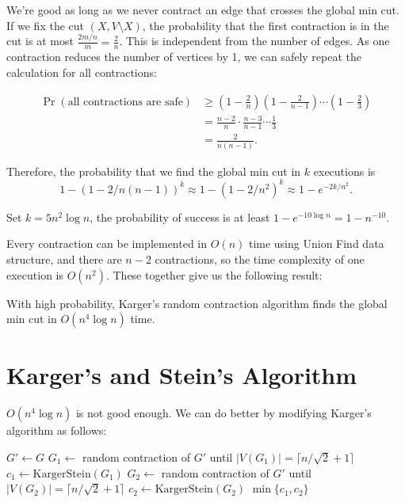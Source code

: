 We're good as long as we never contract an edge that crosses the global min cut. If we fix the cut $(X, V\setminus X)$, the probability that the first contraction is in the cut is at most $\frac{2m/n}{m} = \frac{2}{n}$. This is independent from the number of edges. As one contraction reduces the number of vertices by 1, we can safely repeat the calculation for all contractions:

\begin{align*}
	\Pr(\text{all contractions are safe}) & \geq \left(1-\frac{2}{n}\right)\left(1-\frac{2}{n-1}\right)\cdots \left(1-\frac{2}{3}\right) \\
	                                      & = \frac{n-2}{n}\cdot \frac{n-3}{n-1}\cdots \frac{1}{3}                                       \\
	                                      & = \frac{2}{n(n-1)}.
\end{align*}

Therefore, the probability that we find the global min cut in $k$ executions is
\[
	1 - (1 - 2/n(n-1))^k \approx 1 - (1-2/n^2)^k \approx 1 - e^{-2k/n^2}.
\]

Set $k = 5n^2\log n$, the probability of success is at least $1 - e^{-10\log n} = 1 - n^{-10}$.

Every contraction can be implemented in $O(n)$ time using Union Find data structure, and there are $n-2$ contractions, so the time complexity of one execution is $O(n^2)$. These together give us the following result:

\begin{theorem}
	With high probability, Karger's random contraction algorithm finds the global min cut in $O(n^4\log n)$ time.
\end{theorem}

\section{Karger's and Stein's Algorithm}

$O(n^4\log n)$ is not good enough. We can do better by modifying Karger's algorithm as follows:

\begin{algorithm}[H]
	\caption{Karger's and Stein's Algorithm}
	$G' \gets G$\;
	$G_1 \gets$ random contraction of $G'$ until $|V(G_1)| = \lceil n/\sqrt{2} + 1 \rceil$\;
	$c_1 \gets \text{KargerStein} (G_1)$\;
	$G_2 \gets$ random contraction of $G'$ until $|V(G_2)| = \lceil n/\sqrt{2} + 1 \rceil$\;
	$c_2 \gets \text{KargerStein} (G_2)$\;
	\Return $\min\{c_1, c_2\}$\;
\end{algorithm}

